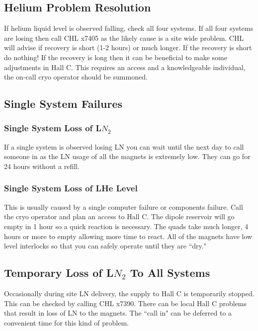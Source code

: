 \documentclass[12pt,epsf,here]{article}
\begin{document}
\subsection{Helium Problem Resolution}

If helium liquid level is observed falling, check all four systems. If all
four systems are losing then call CHL x7405 as the likely cause is a site
wide problem. CHL will advise if recovery is short (1-2 hours) or much   
longer. If the recovery is short do nothing! If the recovery is long then 
it can be beneficial to make some adjustments in Hall C. This requires an 
access and a knowledgeable individual, the on-call cryo operator should be
summoned.

\subsection{Single System Failures}

\subsubsection{Single System Loss of L$N_2$}

If a single system is observed losing LN you can wait until the next day
to call someone in as the LN usage of all the magnets is extremely low.
They can go for 24 hours without a refill.

\subsubsection{Single System Loss of LHe Level}

This is usually caused by a single computer failure or components failure.
Call the cryo operator and plan an access to Hall C. The dipole reservoir
will go empty in 1 hour so a quick reaction is necessary. The quads take
much longer, 4 hours or more to empty allowing more time to react. All of
the magnets have low level interlocks so that you can safely operate until
they are ``dry."

\subsection{Temporary Loss of L$N_2$ To All Systems}  

Occasionally during site LN delivery, the supply to Hall C is temporarily
stopped. This can be checked by calling CHL x7390. There can be local Hall
C problems that result in loss of LN to the magnets. The ``call in" can be
deferred to a convenient time for this kind of problem.
\end{document}
